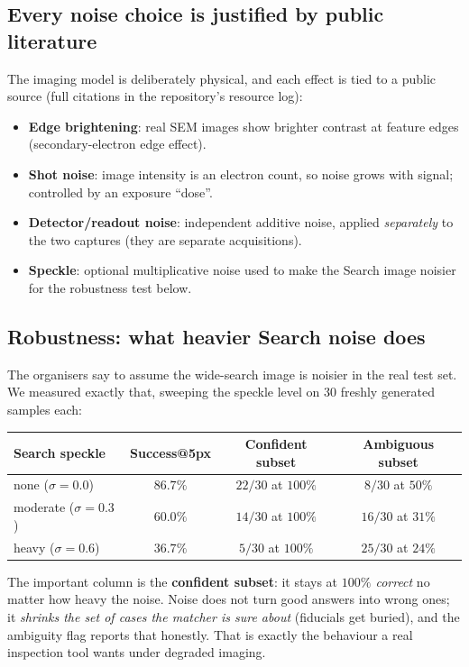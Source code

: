 \documentclass[11pt]{article}
\newcommand{\term}[1]{\textbf{\color{klablue}#1}}
\begin{document}
\subsection{Every noise choice is justified by public literature}
The imaging model is deliberately physical, and each effect is tied to a public
source (full citations in the repository's resource log):
\begin{itemize}[leftmargin=1.4em]
  \item \term{Edge brightening}: real SEM images show brighter contrast at
        feature edges (secondary-electron edge effect).
  \item \term{Shot noise}: image intensity is an electron count, so noise grows
        with signal; controlled by an exposure ``dose''.
  \item \term{Detector/readout noise}: independent additive noise, applied
        \emph{separately} to the two captures (they are separate acquisitions).
  \item \term{Speckle}: optional multiplicative noise used to make the Search
        image noisier for the robustness test below.
\end{itemize}

\subsection{Robustness: what heavier Search noise does}
The organisers say to assume the wide-search image is noisier in the real test
set. We measured exactly that, sweeping the speckle level on $30$ freshly
generated samples each:

\begin{center}
\begin{tabular}{lccc}
\toprule
\term{Search speckle} & \term{Success@5px} & \term{Confident subset} & \term{Ambiguous subset}\\
\midrule
none ($\sigma=0.0$)   & $86.7\%$ & $22/30$ at $100\%$ & $8/30$ at $50\%$\\
moderate ($\sigma=0.3$) & $60.0\%$ & $14/30$ at $100\%$ & $16/30$ at $31\%$\\
heavy ($\sigma=0.6$)  & $36.7\%$ & $5/30$ at $100\%$ & $25/30$ at $24\%$\\
\bottomrule
\end{tabular}
\end{center}

The important column is the \term{confident subset}: it stays at
\emph{$100\%$ correct} no matter how heavy the noise. Noise does not turn good
answers into wrong ones; it \emph{shrinks the set of cases the matcher is sure
about} (fiducials get buried), and the ambiguity flag reports that honestly.
That is exactly the behaviour a real inspection tool wants under degraded
imaging.
\end{document}

